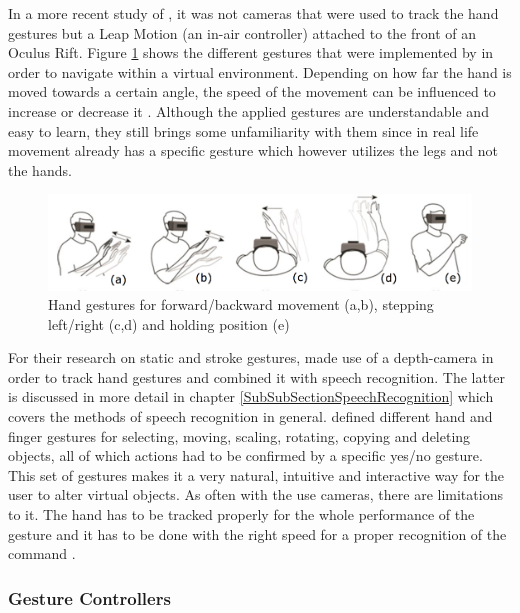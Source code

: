 In a more recent study of \cite{Khundam2015}, it was not cameras that were used to track the hand gestures but a Leap Motion (an in-air controller) attached to the front of an Oculus Rift. Figure \ref{fig:leapmotion} shows the different gestures that were implemented by \cite{Khundam2015} in order to navigate within a virtual environment. Depending on how far the hand is moved towards a certain angle, the speed of the movement can be influenced to increase or decrease it \citep{Khundam2015}. Although the applied gestures are understandable and easy to learn, they still brings some unfamiliarity with them since in real life movement already has a specific gesture which however utilizes the legs and not the hands.
\begin{figure}[h]
	\begin{center}
		\includegraphics[width=14cm]{03_Figures/05_LitReview/Khundam2015_LeapMotion.png}
		\caption[Hand gestures for forward/backward movement, stepping left/right and holding position]{Hand gestures for forward/backward movement (a,b), stepping left/right (c,d) and holding position (e) \citep{Khundam2015}}
		\label{fig:leapmotion}
	\end{center}
\end{figure}
\newline
For their research on static and stroke gestures, \cite{Chun2015} made use of a depth-camera in order to track hand gestures and combined it with speech recognition. The latter is discussed in more detail in chapter \ref{SubSubSectionSpeechRecognition} which covers the methods of speech recognition in general. \cite{Chun2015} defined different hand and finger gestures for selecting, moving, scaling, rotating, copying and deleting objects, all of which actions had to be confirmed by a specific yes/no gesture. This set of gestures makes it a very natural, intuitive and interactive way for the user to alter virtual objects. As often with the use cameras, there are limitations to it. The hand has to be tracked properly for the whole performance of the gesture and it has to be done with the right speed for a proper recognition of the command \citep{Chun2015}.


\subsubsection{Gesture Controllers}

